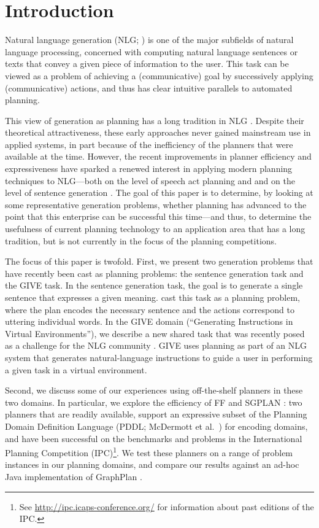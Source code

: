 \section{Introduction}
\label{sec:introduction}

Natural language generation (NLG; \citealp{reiter00building}) is one
of the major subfields of natural language processing, concerned with
computing natural language sentences or texts that convey a given
piece of information to the user. This task can be viewed as a problem
of achieving a (communicative) goal by successively applying
(communicative) actions, and thus has clear intuitive parallels to
automated planning.

This view of generation as planning has a long tradition in NLG
\citep{perrault80,appelt:planning,hovy88,young94dpocl}. Despite their
theoretical attractiveness, these early approaches never gained
mainstream use in applied systems, in part because of the inefficiency
of the planners that were available at the time. However, the recent
improvements in planner efficiency and expressiveness have sparked a
renewed interest in applying modern planning techniques to NLG---both
on the level of speech act planning
\citep{Steedman-Petrick:07,benotti08b} and and on the level of
sentence generation \citep{KolSto07}. The goal of this paper is to
determine, by looking at some representative generation problems,
whether planning has advanced to the point that this enterprise can be
successful this time---and thus, to determine the usefulness of
current planning technology to an application area that has a long
tradition, but is not currently in the focus of the planning
competitions.

The focus of this paper is twofold. First, we present two generation
problems that have recently been cast as planning problems: the
sentence generation task and the GIVE task. In the sentence generation
task, the goal is to generate a single sentence that expresses a given
meaning. \citet{KolSto07} cast this task as a planning problem, where
the plan encodes the necessary sentence and the actions correspond to
uttering individual words.  In the GIVE domain (``Generating
Instructions in Virtual Environments''), we describe a new shared task
that was recently posed as a challenge for the NLG community
\citep{ByrKolStrCasDalMooObe09}.  GIVE uses planning as part of an NLG
system that generates natural-language instructions to guide a user in
performing a given task in a virtual environment.

Second, we discuss some of our experiences using off-the-shelf
planners in these two domains. In particular, we explore the
efficiency of FF \citep{HoffmannNebel01} and SGPLAN
\citep{hsu06:_new_featur_in_sgplan_for}: two planners that are readily
available, support an expressive subset of the Planning Domain
Definition Language (PDDL; McDermott et al.~\citeyear{PDDL}) for
encoding domains, and have been successful on the benchmarks and
problems in the International Planning Competition (IPC)\footnote{See
  \url{http://ipc.icaps-conference.org/} for information about past
  editions of the IPC.}. We test these planners on a range of problem
instances in our planning domains, and compare our results against an
ad-hoc Java implementation of GraphPlan \citep{Blum1997}.

